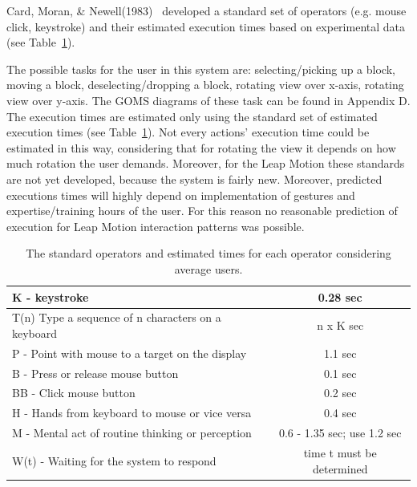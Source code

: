 Card, Moran, \& Newell(1983)~\cite{card1983psychology} developed a standard set of operators (e.g. mouse click, keystroke) and their estimated execution times based on 
experimental data (see Table~\ref{tab:standardops}). 

The possible tasks for the user in this system are: selecting/picking up a block, moving a block, deselecting/dropping a block, rotating view over x-axis, rotating view 
over y-axis. The GOMS diagrams of these task can be found in Appendix D. The execution times are estimated only using the standard set of estimated execution times 
(see Table~\ref{tab:standardops}). Not every actions' execution time could be estimated in this way, considering that for rotating the view it depends on how much 
rotation the user demands. Moreover, for the Leap Motion these standards are not yet developed, because the system is fairly new. Moreover, predicted executions times will highly 
depend on implementation of gestures and expertise/training hours of the user. For this reason no reasonable prediction of execution for Leap Motion interaction patterns was possible.


\begin{table}[H]
\centering
\begin{tabular}{|l|c|}
\hline
K - keystroke & 0.28 sec\\ \hline
T(n) Type a sequence of n characters on a keyboard & n x K sec \\ \hline
P - Point with mouse to a target on the display & 1.1 sec \\ \hline
B - Press or release mouse button & 0.1 sec \\ \hline
BB - Click mouse button & 0.2 sec \\ \hline
H - Hands from keyboard to mouse or vice versa & 0.4 sec \\  \hline
M - Mental act of routine thinking or perception & 0.6 - 1.35 sec; use 1.2 sec \\ \hline
W(t) - Waiting for the system to respond & time t must be determined \\ 
\hline
\end{tabular}
\caption{\label{tab:standardops} The standard operators and estimated times for each operator considering average users.}
\end{table}

